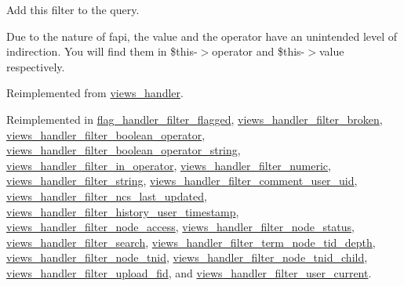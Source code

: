 Add this filter to the query.

Due to the nature of fapi, the value and the operator have an unintended level of indirection. You will find them in \$this-$>$operator and \$this-$>$value respectively. 

Reimplemented from \hyperlink{classviews__handler_91e22c95696d9fdb9ed753a10d42a21d}{views\_\-handler}.

Reimplemented in \hyperlink{classflag__handler__filter__flagged_c01506ba4593bc1ab5b7b40f89843e82}{flag\_\-handler\_\-filter\_\-flagged}, \hyperlink{classviews__handler__filter__broken_15895a67b79ccabcab4d21945a38477b}{views\_\-handler\_\-filter\_\-broken}, \hyperlink{classviews__handler__filter__boolean__operator_b3afc650701939c060e684d75fa2b21b}{views\_\-handler\_\-filter\_\-boolean\_\-operator}, \hyperlink{classviews__handler__filter__boolean__operator__string_d4d0444476749372e38591ad058ee1cd}{views\_\-handler\_\-filter\_\-boolean\_\-operator\_\-string}, \hyperlink{classviews__handler__filter__in__operator_f4b9a596ad1e6fbee116977ca0a7d8a9}{views\_\-handler\_\-filter\_\-in\_\-operator}, \hyperlink{classviews__handler__filter__numeric_aa5c6b227651bd1676850f5999f2a897}{views\_\-handler\_\-filter\_\-numeric}, \hyperlink{classviews__handler__filter__string_fcfdae379583a2eb912e1b82d4513503}{views\_\-handler\_\-filter\_\-string}, \hyperlink{classviews__handler__filter__comment__user__uid_5b649bd04038ac8ed577410ad54ad5b0}{views\_\-handler\_\-filter\_\-comment\_\-user\_\-uid}, \hyperlink{classviews__handler__filter__ncs__last__updated_fdcfcb18506212eb4b5df8b19971ff48}{views\_\-handler\_\-filter\_\-ncs\_\-last\_\-updated}, \hyperlink{classviews__handler__filter__history__user__timestamp_c7499e60ca61853a3cd37fcbaa3c0618}{views\_\-handler\_\-filter\_\-history\_\-user\_\-timestamp}, \hyperlink{classviews__handler__filter__node__access_b7f054a6a94abf2f41ce70fd40cf2e5e}{views\_\-handler\_\-filter\_\-node\_\-access}, \hyperlink{classviews__handler__filter__node__status_4f5351bb3567b5fe8bca111ffca83690}{views\_\-handler\_\-filter\_\-node\_\-status}, \hyperlink{classviews__handler__filter__search_f972f15bdc716b36d04d9a9d4f20b6f5}{views\_\-handler\_\-filter\_\-search}, \hyperlink{classviews__handler__filter__term__node__tid__depth_ff1d2c0057597790a56bffd0674f391a}{views\_\-handler\_\-filter\_\-term\_\-node\_\-tid\_\-depth}, \hyperlink{classviews__handler__filter__node__tnid_7e51dd45867a8a4a3c965a09d0ecd3b6}{views\_\-handler\_\-filter\_\-node\_\-tnid}, \hyperlink{classviews__handler__filter__node__tnid__child_a21b64d11f0f79a113be65b65e6249e0}{views\_\-handler\_\-filter\_\-node\_\-tnid\_\-child}, \hyperlink{classviews__handler__filter__upload__fid_84a251fda29d367d7c915b736fe43b46}{views\_\-handler\_\-filter\_\-upload\_\-fid}, and \hyperlink{classviews__handler__filter__user__current_6002cf25d2385bd07c771f9a65cee48f}{views\_\-handler\_\-filter\_\-user\_\-current}.\hypertarget{classviews__handler__filter_fa388297472d32d4bcb976bf3515d16a}{
}
